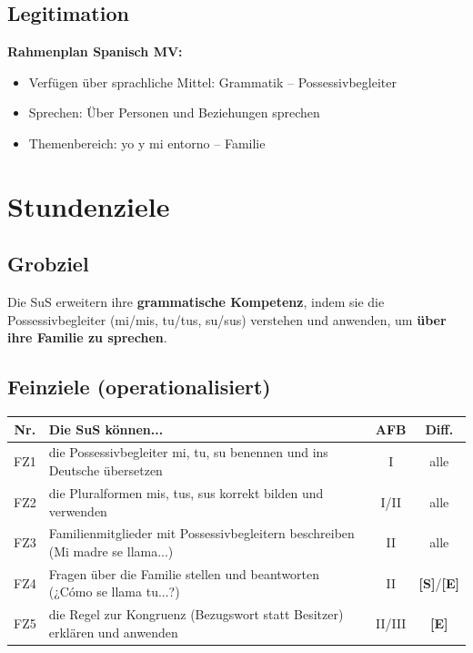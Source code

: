 \documentclass[11pt,a4paper]{article}
\newcommand{\Std}{\textcolor{standard}{\textbf{[S]}}}
\newcommand{\E}{\textcolor{erweiterung}{\textbf{[E]}}}
\begin{document}
\subsection{Legitimation}
\textbf{Rahmenplan Spanisch MV:}
\begin{itemize}
    \item Verfügen über sprachliche Mittel: Grammatik -- Possessivbegleiter
    \item Sprechen: Über Personen und Beziehungen sprechen
    \item Themenbereich: yo y mi entorno -- Familie
\end{itemize}

\section{Stundenziele}

\subsection{Grobziel}
Die SuS erweitern ihre \textbf{grammatische Kompetenz}, indem sie die Possessivbegleiter (mi/mis, tu/tus, su/sus) verstehen und anwenden, um \textbf{über ihre Familie zu sprechen}.

\subsection{Feinziele (operationalisiert)}
\begin{tabular}{|c|p{8cm}|c|c|}
\hline
\textbf{Nr.} & \textbf{Die SuS können...} & \textbf{AFB} & \textbf{Diff.} \\
\hline
FZ1 & die Possessivbegleiter mi, tu, su benennen und ins Deutsche übersetzen & I & alle \\
\hline
FZ2 & die Pluralformen mis, tus, sus korrekt bilden und verwenden & I/II & alle \\
\hline
FZ3 & Familienmitglieder mit Possessivbegleitern beschreiben (Mi madre se llama...) & II & alle \\
\hline
FZ4 & Fragen über die Familie stellen und beantworten (¿Cómo se llama tu...?) & II & \Std{}/\E{} \\
\hline
FZ5 & die Regel zur Kongruenz (Bezugswort statt Besitzer) erklären und anwenden & II/III & \E{} \\
\hline
\end{tabular}
\end{document}
